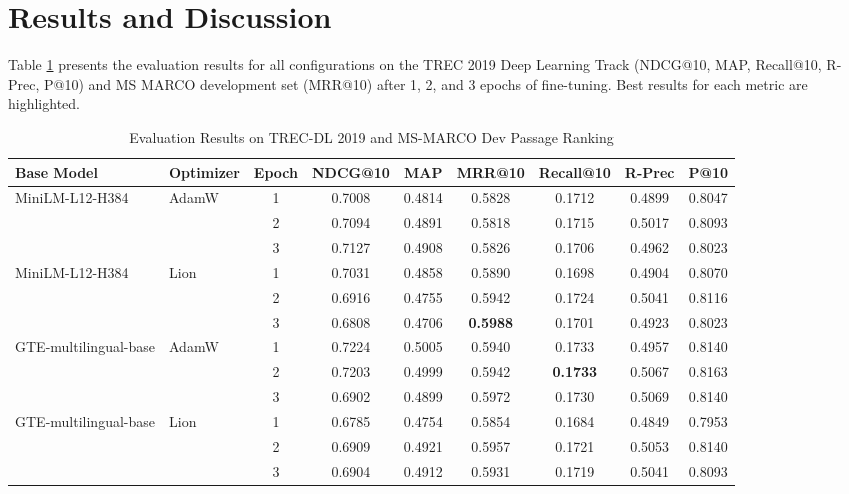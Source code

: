 \documentclass[conference]{IEEEtran}
\begin{document}
\section{Results and Discussion}
\label{sec:results}
Table \ref{tab:main_results} presents the evaluation results for all configurations on the TREC 2019 Deep Learning Track (NDCG@10, MAP, Recall@10, R-Prec, P@10) and MS MARCO development set (MRR@10) after 1, 2, and 3 epochs of fine-tuning. Best results for each metric are highlighted.

\begin{table}[htbp]
\centering
\caption{Evaluation Results on TREC-DL 2019 and MS-MARCO Dev Passage Ranking}
\label{tab:main_results}
\begin{tabular}{l l c c c c c c c}
\toprule
\textbf{Base Model} & \textbf{Optimizer} & \textbf{Epoch} & \textbf{NDCG@10} & \textbf{MAP} & \textbf{MRR@10} & \textbf{Recall@10} & \textbf{R-Prec} & \textbf{P@10} \\
\midrule
\multirow{3}{*}{MiniLM-L12-H384} & \multirow{3}{*}{AdamW}
    & 1 & 0.7008 & 0.4814 & 0.5828 & 0.1712 & 0.4899 & 0.8047 \\
    & & 2 & 0.7094 & 0.4891 & 0.5818 & 0.1715 & 0.5017 & 0.8093 \\
    & & 3 & 0.7127 & 0.4908 & 0.5826 & 0.1706 & 0.4962 & 0.8023 \\
\midrule
\multirow{3}{*}{MiniLM-L12-H384} & \multirow{3}{*}{Lion}
    & 1 & 0.7031 & 0.4858 & 0.5890 & 0.1698 & 0.4904 & 0.8070 \\
    & & 2 & 0.6916 & 0.4755 & 0.5942 & 0.1724 & 0.5041 & 0.8116 \\
    & & 3 & 0.6808 & 0.4706 & \cellcolor{yellow!50}\textbf{0.5988} & 0.1701 & 0.4923 & 0.8023 \\
\midrule
\multirow{3}{*}{GTE-multilingual-base} & \multirow{3}{*}{AdamW}
    & 1 & 0.7224 & 0.5005 & 0.5940 & 0.1733 & 0.4957 & 0.8140 \\
    & & 2 & 0.7203 & 0.4999 & 0.5942 & \cellcolor{yellow!50}\textbf{0.1733} & 0.5067 & 0.8163 \\
    & & 3 & 0.6902 & 0.4899 & 0.5972 & 0.1730 & 0.5069 & 0.8140 \\
\midrule
\multirow{3}{*}{GTE-multilingual-base} & \multirow{3}{*}{Lion}
    & 1 & 0.6785 & 0.4754 & 0.5854 & 0.1684 & 0.4849 & 0.7953 \\
    & & 2 & 0.6909 & 0.4921 & 0.5957 & 0.1721 & 0.5053 & 0.8140 \\
    & & 3 & 0.6904 & 0.4912 & 0.5931 & 0.1719 & 0.5041 & 0.8093 \\

\end{tabular}
\end{table}
\end{document}
